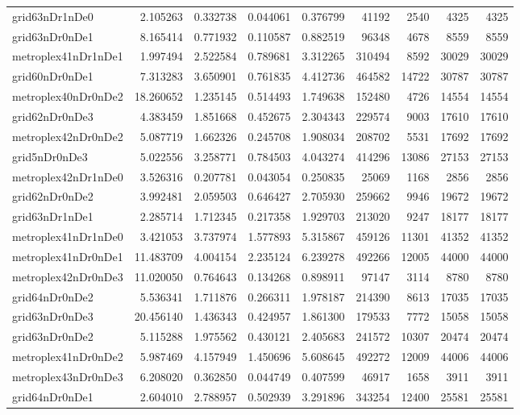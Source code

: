 \documentclass[../../../thesis.tex]{subfiles}
\begin{document}
\begin{longtable}{|l|r|r|r|r|r|r|r|r|}
grid63nDr1nDe0 & 2.105263 & 0.332738 & 0.044061 & 0.376799 & 41192 & 2540 & 4325 & 4325 \\
grid63nDr0nDe1 & 8.165414 & 0.771932 & 0.110587 & 0.882519 & 96348 & 4678 & 8559 & 8559 \\
metroplex41nDr1nDe1 & 1.997494 & 2.522584 & 0.789681 & 3.312265 & 310494 & 8592 & 30029 & 30029 \\
grid60nDr0nDe1 & 7.313283 & 3.650901 & 0.761835 & 4.412736 & 464582 & 14722 & 30787 & 30787 \\
metroplex40nDr0nDe2 & 18.260652 & 1.235145 & 0.514493 & 1.749638 & 152480 & 4726 & 14554 & 14554 \\
grid62nDr0nDe3 & 4.383459 & 1.851668 & 0.452675 & 2.304343 & 229574 & 9003 & 17610 & 17610 \\
metroplex42nDr0nDe2 & 5.087719 & 1.662326 & 0.245708 & 1.908034 & 208702 & 5531 & 17692 & 17692 \\
grid5nDr0nDe3 & 5.022556 & 3.258771 & 0.784503 & 4.043274 & 414296 & 13086 & 27153 & 27153 \\
metroplex42nDr1nDe0 & 3.526316 & 0.207781 & 0.043054 & 0.250835 & 25069 & 1168 & 2856 & 2856 \\
grid62nDr0nDe2 & 3.992481 & 2.059503 & 0.646427 & 2.705930 & 259662 & 9946 & 19672 & 19672 \\
grid63nDr1nDe1 & 2.285714 & 1.712345 & 0.217358 & 1.929703 & 213020 & 9247 & 18177 & 18177 \\
metroplex41nDr1nDe0 & 3.421053 & 3.737974 & 1.577893 & 5.315867 & 459126 & 11301 & 41352 & 41352 \\
metroplex41nDr0nDe1 & 11.483709 & 4.004154 & 2.235124 & 6.239278 & 492266 & 12005 & 44000 & 44000 \\
metroplex42nDr0nDe3 & 11.020050 & 0.764643 & 0.134268 & 0.898911 & 97147 & 3114 & 8780 & 8780 \\
grid64nDr0nDe2 & 5.536341 & 1.711876 & 0.266311 & 1.978187 & 214390 & 8613 & 17035 & 17035 \\
grid63nDr0nDe3 & 20.456140 & 1.436343 & 0.424957 & 1.861300 & 179533 & 7772 & 15058 & 15058 \\
grid63nDr0nDe2 & 5.115288 & 1.975562 & 0.430121 & 2.405683 & 241572 & 10307 & 20474 & 20474 \\
metroplex41nDr0nDe2 & 5.987469 & 4.157949 & 1.450696 & 5.608645 & 492272 & 12009 & 44006 & 44006 \\
metroplex43nDr0nDe3 & 6.208020 & 0.362850 & 0.044749 & 0.407599 & 46917 & 1658 & 3911 & 3911 \\
grid64nDr0nDe1 & 2.604010 & 2.788957 & 0.502939 & 3.291896 & 343254 & 12400 & 25581 & 25581 \\

\end{longtable}
\end{document}
